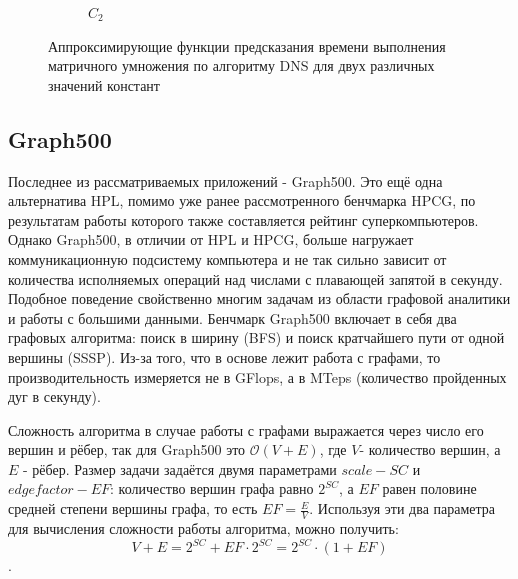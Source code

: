 \begin{figure}
\begin{subfigure}{.5\textwidth}
				\caption{\(C_2\)}
				\label{graph_C_2_DNS}
			\end{subfigure}
			\caption{Аппроксимирующие функции предсказания времени выполнения матричного умножения по алгоритму DNS для двух различных значений констант}
			\label{graph_DNS}
			\end{figure}

	\subsection{Graph500}
		Последнее из рассматриваемых приложений - Graph500. Это ещё одна альтернатива HPL, помимо уже ранее рассмотренного бенчмарка HPCG, по результатам работы которого также составляется рейтинг суперкомпьютеров. Однако Graph500, в отличии от HPL и HPCG, больше нагружает коммуникационную подсистему компьютера и не так сильно зависит от количества исполняемых операций над числами с плавающей запятой в секунду. Подобное поведение свойственно многим задачам из области графовой аналитики и работы с большими данными. Бенчмарк Graph500 включает в себя два графовых алгоритма: поиск в ширину (BFS) и поиск кратчайшего пути от одной вершины (SSSP). Из-за того, что в основе лежит работа с графами, то производительность измеряется не в GFlops, а в MTeps (количество пройденных дуг в секунду).

		Сложность алгоритма в случае работы с графами выражается через число его вершин и рёбер, так для Graph500 это \(\mathcal{O}(V + E)\), где \(V\)- количество вершин, а \(E\) - рёбер. Размер задачи задаётся двумя параметрами \(scale - SC\) и \(edgefactor - EF\): количество вершин графа равно \(2^{SC}\), а \(EF\) равен половине средней степени вершины графа, то есть \(EF = \frac{E}{V}\). Используя эти два параметра для вычисления сложности работы алгоритма, можно получить: \[V + E = 2^{SC} + EF \cdot 2^{SC} = 2^{SC} \cdot (1 + EF) \].

